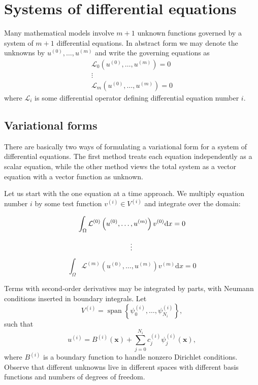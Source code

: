 \documentclass[../main.tex]{subfiles}
\begin{document}
\chapter{Systems of differential equations}
\label{chap:chap_20}

\noindent Many mathematical models involve $m+1$ unknown functions governed by a system of $m+1$ differential equations. In abstract form we may denote the unknowns by $u^{(0)}, \ldots, u^{(m)}$ and write the governing equations as
$$
\begin{gathered}
	\mathcal{L}_{0}\left(u^{(0)}, \ldots, u^{(m)}\right)=0 \\
	\vdots \\
	\mathcal{L}_{m}\left(u^{(0)}, \ldots, u^{(m)}\right)=0
\end{gathered}
$$
where $\mathcal{L}_{i}$ is some differential operator defining differential equation number $i$.\smallbreak
	\section[Systems of differential equations]{Variational forms}
		\label{sec:sec_20_1}
		\noindent There are basically two ways of formulating a variational form for a system of differential equations. The first method treats each equation independently as a scalar equation, while the other method views the total system as a vector equation with a vector function as unknown.
		
		Let us start with the one equation at a time approach. We multiply equation number $i$ by some test function $v^{(i)} \in V^{(i)}$ and integrate over the domain:
		
		\begin{equation}
		\label{eqa256}
			\int_{\Omega} \mathcal{L}^{(0)}\left(u^{(0)}, \ldots, u^{(m)}\right) v^{(0)} \mathrm{d} x=0 \\
		\end{equation}
			
		\begin{equation}
		\label{eqa257}
			\vdots \\
		\end{equation}
	
		\begin{equation}
		\label{eqa258}
			\int_{\Omega} \mathcal{L}^{(m)}\left(u^{(0)}, \ldots, u^{(m)}\right) v^{(m)} \mathrm{d} x=0
		\end{equation}
	
		\noindent Terms with second-order derivatives may be integrated by parts, with Neumann conditions inserted in boundary integrals. Let
		$$
		V^{(i)}=\operatorname{span}\left\{\psi_{0}^{(i)}, \ldots, \psi_{N_{i}}^{(i)}\right\},
		$$
		such that
		$$
		u^{(i)}=B^{(i)}(\boldsymbol{x})+\sum_{j=0}^{N_{i}} c_{j}^{(i)} \psi_{j}^{(i)}(\boldsymbol{x}),
		$$
		where $B^{(i)}$ is a boundary function to handle nonzero Dirichlet conditions. Observe that different unknowns live in different spaces with different basis functions and numbers of degrees of freedom.
		
\end{document}
